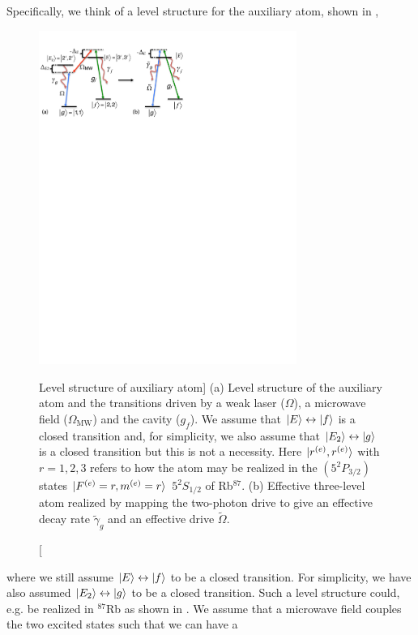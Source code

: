 Specifically, we think of a level structure for the auxiliary atom, shown in
,
\begin{figure} 
\centering
\includegraphics[width=0.75\textwidth]{./figs_Borregaard_PRL2015/figure4}
\caption
[Level structure of auxiliary atom]
{(a) Level
structure of the auxiliary atom and the transitions driven by a weak laser ($\Omega$), a microwave field ($\Omega_{\text{MW}}$) and the cavity ($g_{f}$). We assume that
$| E \rangle\leftrightarrow| f \rangle$ is a closed transition and, for simplicity, we
also assume that $| E_{2} \rangle\leftrightarrow| g \rangle$ is a closed transition but
this is not a necessity. Here $| r^{(e)},r^{(e)} \rangle$ with $r=1,2,3$ refers to
how the atom may be realized in the $(5^{2}P_{3/2})$ states
$| F^{(e)}=r,m^{(e)}=r \rangle$ $5^{2}S_{1/2}$ of Rb${}^{87}$. (b) Effective
three-level atom realized by mapping the two-photon drive to give an effective
decay rate $\tilde{\gamma}_{g}$ and an effective drive $\tilde{\Omega}$. }
\label{fig:control}
\end{figure} 
where we still assume $| E \rangle\leftrightarrow| f \rangle$ to be a closed transition.
For simplicity, we have also assumed $| E_{2} \rangle\leftrightarrow| g \rangle$ to be a
closed transition. Such a level structure could,
e.g. be realized in  ${}^{87}$Rb  as shown in .  We assume
that a microwave field couples the two excited states such that we can have a
